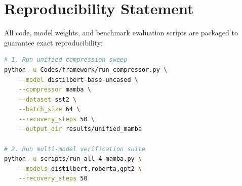 \section{Reproducibility Statement}
All code, model weights, and benchmark evaluation scripts are packaged to guarantee exact reproducibility:
\begin{lstlisting}[language=bash]
# 1. Run unified compression sweep
python -u Codes/framework/run_compressor.py \
    --model distilbert-base-uncased \
    --compressor mamba \
    --dataset sst2 \
    --batch_size 64 \
    --recovery_steps 50 \
    --output_dir results/unified_mamba

# 2. Run multi-model verification suite
python -u scripts/run_all_4_mamba.py \
    --models distilbert,roberta,gpt2 \
    --recovery_steps 50
\end{lstlisting}
